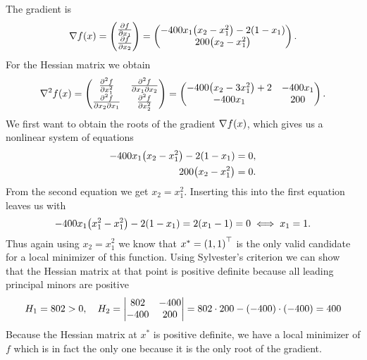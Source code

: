 \documentclass{exercise}
\begin{document}
	The gradient is
	\[
		\nabla f\parentheses*{x} = \begin{pmatrix}
			\frac{\partial f}{\partial x_1}\\
			\frac{\partial f}{\partial x_2}
		\end{pmatrix} = \begin{pmatrix}
			-400x_1\parentheses*{x_2 - x_1^2} - 2\parentheses*{1 - x_1}\\
			200\parentheses*{x_2 - x_1^2}
		\end{pmatrix}.
	\]
	For the Hessian matrix we obtain
	\[
		\nabla^2 f\parentheses*{x} = \begin{pmatrix}
			\frac{\partial^2 f}{\partial x_1^2} & \frac{\partial^2 f}{\partial x_1 \partial x_2}\\
			\frac{\partial^2 f}{\partial x_2 \partial x_1} & \frac{\partial^2 f}{\partial x_2^2}
		\end{pmatrix} = \begin{pmatrix}
			-400\parentheses*{x_2 - 3x_1^2} + 2 & -400x_1\\
			-400x_1 & 200
		\end{pmatrix}.
	\]
	We first want to obtain the roots of the gradient \(\nabla f\parentheses*{x}\), which gives us a nonlinear system of equations
	\begin{align*}
		-400x_1\parentheses*{x_2 - x_1^2} - 2\parentheses*{1 - x_1} &= 0,\\
		200\parentheses*{x_2 - x_1^2} &= 0.
	\end{align*}
	From the second equation we get \(x_2 = x_1^2\).
	Inserting this into the first equation leaves us with
	\[
		-400x_1\parentheses*{x_1^2 - x_1^2} - 2\parentheses*{1 - x_1} = 2\parentheses*{x_1 - 1} = 0 \iff x_1 = 1.
	\]
	Thus again using \(x_2 = x_1^2\) we know that \(x^* = \parentheses*{1, 1}^\top\) is the only valid candidate for a local minimizer of this function.
	Using Sylvester's criterion we can show that the Hessian matrix at that point is positive definite because all leading principal minors are positive
	\[
		H_1 = 802 > 0, \quad H_2 = \begin{vmatrix}
			802 & -400\\
			-400 & 200
		\end{vmatrix} = 802 \cdot 200 - \parentheses*{-400} \cdot \parentheses*{-400} = 400
	\]
	Because the Hessian matrix at \(x^*\) is positive definite, we have a local minimizer of \(f\) which is in fact the only one because it is the only root of the gradient.


	\section{}
\end{document}
